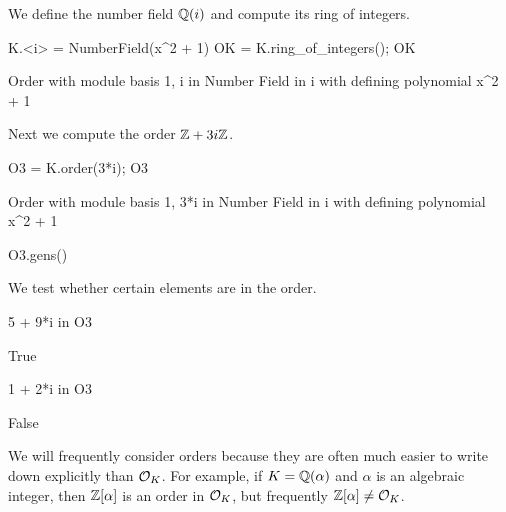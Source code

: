 We define the number field $\mathbb{Q}(i)$ and compute its
ring of integers.
\begin{sagecode}
\begin{sagecell}
K.<i> = NumberField(x^2 + 1)
OK = K.ring_of_integers(); OK
\end{sagecell}
\begin{sageout}
Order with module basis 1, i in Number Field in i with 
defining polynomial x^2 + 1
\end{sageout}
\end{sagecode}

\noindent Next we compute the order $\mathbb{Z} + 3i \mathbb{Z}$.
\begin{sagecode}
\begin{sagecell}
O3 = K.order(3*i); O3
\end{sagecell}
\begin{sageout}
Order with module basis 1, 3*i in Number Field in i with 
defining polynomial x^2 + 1
\end{sageout}
\begin{sagecell}
O3.gens()
\end{sagecell}
\begin{sageout}
[1, 3*i]
\end{sageout}
\end{sagecode}


\noindent We test whether certain elements are in the order.
\begin{sagecode}
\begin{sagecell}
5 + 9*i in O3
\end{sagecell}
\begin{sageout}
True
\end{sageout}
\begin{sagecell}
1 + 2*i in O3
\end{sagecell}
\begin{sageout}
False
\end{sageout}
\end{sagecode}


We will frequently consider orders because they are often much easier
to write down explicitly than $\mathcal{O}_K$.  For example, if $K=\mathbb{Q}(\alpha)$
and $\alpha$ is an algebraic integer, then $\mathbb{Z}[\alpha]$ is an order in
$\mathcal{O}_K$, but frequently $\mathbb{Z}[\alpha]\neq \mathcal{O}_K$.

